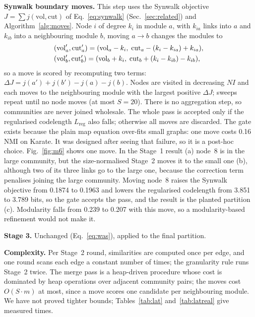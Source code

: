 \documentclass[conference]{IEEEtran}
\begin{document}
\textbf{Synwalk boundary moves.} This step uses the Synwalk objective $J=\sum j(\mathrm{vol},\mathrm{cut})$ of Eq.~\eqref{eq:synwalk} (Sec.~\ref{sec:related}) and Algorithm~\ref{alg:moves}. Node $i$ of degree $k_i$ in module $a$, with $k_{ia}$ links into $a$ and $k_{ib}$ into a neighbouring module $b$, moving $a\to b$ changes the modules to
\begin{align}
&(\mathrm{vol}_a',\mathrm{cut}_a')=(\mathrm{vol}_a-k_i,\;\mathrm{cut}_a-(k_i-k_{ia})+k_{ia}),\notag\\
&(\mathrm{vol}_b',\mathrm{cut}_b')=(\mathrm{vol}_b+k_i,\;\mathrm{cut}_b+(k_i-k_{ib})-k_{ib}),\label{eq:move}
\end{align}
so a move is scored by recomputing two terms: $\Delta J=j(a')+j(b')-j(a)-j(b)$. Nodes are visited in decreasing $NI$ and each moves to the neighbouring module with the largest positive $\Delta J$; sweeps repeat until no node moves (at most $S=20$). There is no aggregation step, so communities are never joined wholesale. The whole pass is accepted only if the regularised codelength $L_{\mathrm{reg}}$ also falls; otherwise all moves are discarded. The gate exists because the plain map equation over-fits small graphs: one move costs 0.16 NMI on Karate. It was designed after seeing that failure, so it is a post-hoc choice. Fig.~\ref{fig:m6} shows one move. In the Stage~1 result (a) node~8 is in the large community, but the size-normalised Stage~2 moves it to the small one (b), although two of its three links go to the large one, because the correction term penalises joining the large community. Moving node~8 raises the Synwalk objective from 0.1874 to 0.1963 and lowers the regularised codelength from 3.851 to 3.789 bits, so the gate accepts the pass, and the result is the planted partition (c). Modularity falls from 0.239 to 0.207 with this move, so a modularity-based refinement would not make it.

\textbf{Stage 3.} Unchanged (Eq.~\eqref{eq:was}), applied to the final partition.



\textbf{Complexity.} Per Stage~2 round, similarities are computed once per edge, and one round scans each edge a constant number of times; the granularity rule runs Stage~2 twice. The merge pass is a heap-driven procedure whose cost is dominated by heap operations over adjacent community pairs; the moves cost $O(S\cdot m)$ at most, since a move scores one candidate per neighbouring module. We have not proved tighter bounds; Tables~\ref{tab:lat} and~\ref{tab:latreal} give measured times.
\end{document}
